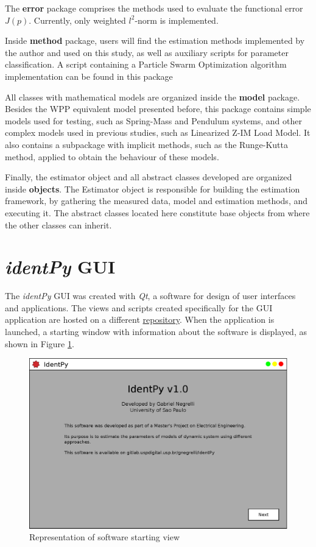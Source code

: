 The \textbf{error} package comprises the methods used to evaluate the functional error $J(p)$. Currently, only weighted $l^{2}$-norm is implemented.

Inside \textbf{method} package, users will find the estimation methods implemented by the author and used on this study, as well as auxiliary scripts for parameter classification. A script containing a Particle Swarm Optimization algorithm implementation can be found in this package

All classes with mathematical models are organized inside the \textbf{model} package. Besides the WPP equivalent model presented before, this package contains simple models used for testing, such as Spring-Mass and Pendulum systems, and other complex models used in previous studies, such as Linearized Z-IM Load Model. It also contains a subpackage with implicit methods, such as the Runge-Kutta method, applied to obtain the behaviour of these models.

Finally, the estimator object and all abstract classes developed are organized inside \textbf{objects}. The Estimator object is responsible for building the estimation framework, by gathering the measured data, model and estimation methods, and executing it. The abstract classes located here constitute base objects from where the other classes can inherit.

\section{\textit{identPy} GUI}

The \textit{identPy} GUI was created with \textit{Qt}, a software for design of user interfaces and applications. The views and scripts created specifically for the GUI application are hosted on a different \href{https://github.com/gnegrelli/identPy_GUI}{repository}. When the application is launched, a starting window with information about the software is displayed, as shown in Figure \ref{fig: initial_page}.

\begin{figure}[h]
	\caption{Representation of software starting view}
	\begin{center}
		\includegraphics[scale=.5]{Images/Software_init_pg.eps}
	\end{center}
	\label{fig: initial_page}
\end{figure}

